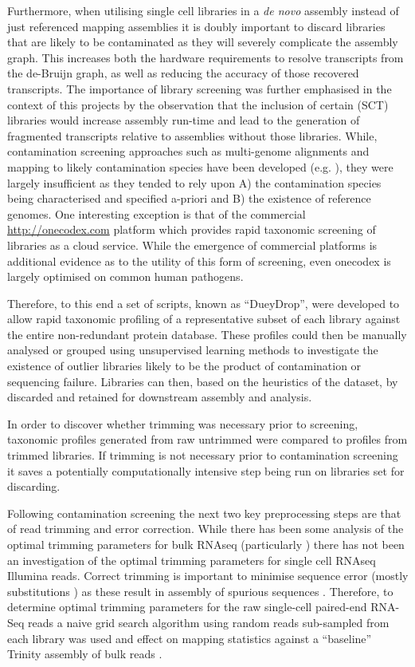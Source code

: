 Furthermore, when utilising single cell libraries in a \textit{de novo} assembly instead of just referenced mapping assemblies
it is doubly important to discard libraries that are likely to be contaminated as they will severely complicate
the assembly graph. This increases both the hardware requirements to resolve transcripts from the de-Bruijn graph, as well
as reducing the accuracy of those recovered transcripts.  The importance of library screening was further emphasised
in the context of this projects by the observation that the inclusion of certain (SCT) libraries would increase
assembly run-time and lead to the generation of fragmented transcripts relative to assemblies without those
libraries.  While, contamination screening approaches such as multi-genome alignments and mapping to likely contamination
species have been developed (e.g. \citep{Hadfield2014}), they were largely insufficient as they tended to rely upon 
A) the contamination species being characterised and specified a-priori and B) the existence of reference genomes.
One interesting exception is that of the commercial \url{http://onecodex.com} platform which provides
rapid taxonomic screening of libraries as a cloud service.  While the emergence of commercial platforms
is additional evidence as to the utility of this form of screening, even onecodex is largely optimised
on common human pathogens.


Therefore, to this end a set of scripts, known as ``DueyDrop'', were developed to allow rapid taxonomic profiling of a
representative subset of each library against the entire non-redundant protein database.  
These profiles could then be manually analysed or grouped using unsupervised learning methods to investigate the existence of 
outlier libraries likely to be the product of contamination or sequencing failure.   Libraries can then,
based on the heuristics of the dataset, by discarded and retained for downstream assembly and analysis.

In order to discover whether trimming was necessary prior to screening, taxonomic profiles generated from raw untrimmed 
were compared to profiles from trimmed libraries. If trimming is not necessary prior to contamination screening
it saves a potentially computationally intensive step being run on libraries set for discarding.


Following contamination screening the next two key preprocessing steps are that of read trimming and error correction.
While there has been some analysis of the optimal trimming parameters for bulk RNAseq (particularly \citep{Macmanes2014})
there has not been an investigation of the optimal trimming parameters for single cell RNAseq Illumina reads.
Correct trimming is important to minimise sequence error (mostly substitutions \citep{Yang2013}) as these
result in assembly of spurious sequences \citep{Macmanes2013,Macmanes2014}.  Therefore, to determine
optimal trimming parameters for the raw single-cell paired-end RNA-Seq reads 
a naive grid search algorithm using random reads sub-sampled from each library was used and effect on mapping
statistics against a ``baseline'' Trinity assembly of bulk reads \citep{Haas2013}.

